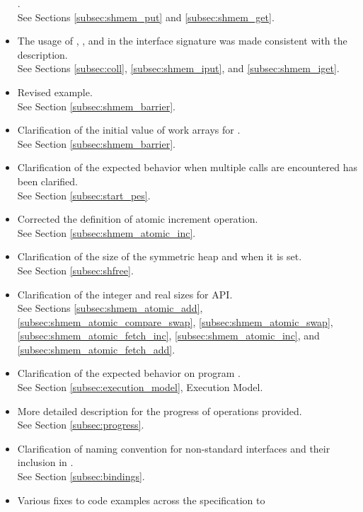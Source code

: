 \begin{itemize}
      .
\\See Sections \ref{subsec:shmem_put} and \ref{subsec:shmem_get}. 
%
\item The usage of , , and  in the
      interface signature was made consistent with the description.
\\See Sections \ref{subsec:coll}, \ref{subsec:shmem_iput}, and \ref{subsec:shmem_iget}.
%
\item Revised  example.
\\See Section \ref{subsec:shmem_barrier}. 
%
\item Clarification of the initial value of  work arrays for
.\\ See Section \ref{subsec:shmem_barrier}. 
%
\item Clarification of the expected behavior when multiple 
calls are encountered has been clarified.
\\See Section \ref{subsec:start_pes}.
%
\item Corrected the definition of atomic increment operation.
\\See Section \ref{subsec:shmem_atomic_inc}.
%
\item Clarification of the size of the symmetric heap and when it is set.
\\See Section \ref{subsec:shfree}.
%
\item Clarification of the integer and real sizes for \Fortran \ac{API}.
\\See Sections \ref{subsec:shmem_atomic_add},
      \ref{subsec:shmem_atomic_compare_swap},
      \ref{subsec:shmem_atomic_swap},
      \ref{subsec:shmem_atomic_fetch_inc},
      \ref{subsec:shmem_atomic_inc}, and
      \ref{subsec:shmem_atomic_fetch_add}.
%
\item Clarification of the expected behavior on program .
\\See Section \ref{subsec:execution_model}, Execution Model. 
%
\item More detailed description for the progress of \openshmem operations
provided.
\\See Section \ref{subsec:progress}. 
%
\item Clarification of naming convention for non-standard interfaces and their
inclusion in .
\\See Section \ref{subsec:bindings}. 
%
\item Various fixes to \openshmem code examples across the specification to

\end{itemize}
